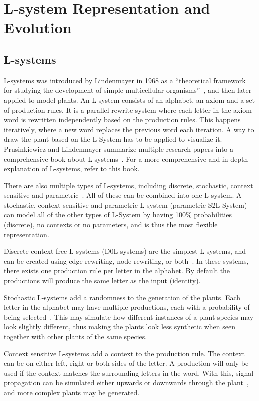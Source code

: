 \chapter{L-system Representation and Evolution}

\section{L-systems}
L-systems was introduced by Lindenmayer in 1968 as a ``theoretical framework for studying the development of simple multicellular organisms''~\cite{2012Prusinkiewicz}, and then later applied to model plants.
An L-system consists of an alphabet, an axiom and a set of production rules.
It is a parallel rewrite system where each letter in the axiom word is rewritten independently based on the production rules.
This happens iteratively, where a new word replaces the previous word each iteration.
A way to draw the plant based on the L-System has to be applied to visualize it.
Prusinkiewicz and Lindenmayer summarize multiple research papers into a comprehensive book about L-systems~\cite{2012Prusinkiewicz}.
For a more comprehensive and in-depth explanation of L-systems, refer to this book.

There are also multiple types of L-systems, including discrete, stochastic, context sensitive and parametric~\cite{2012Prusinkiewicz}.
All of these can be combined into one L-system.
A stochastic, context sensitive and parametric L-system (parametric S2L-System) can model all of the other types of L-System by having 100\% probabilities (discrete), no contexts or no parameters, and is thus the most flexible representation.

Discrete context-free L-systems (D0L-systems) are the simplest L-systems, and can be created using edge rewriting, node rewriting, or both~\cite{2012Prusinkiewicz}.
In these systems, there exists one production rule per letter in the alphabet.
By default the productions will produce the same letter as the input (identity).

Stochastic L-systems add a randomness to the generation of the plants.
Each letter in the alphabet may have multiple productions, each with a probability of being selected~\cite{2012Prusinkiewicz}.
This may simulate how different instances of a plant species may look slightly different, thus making the plants look less synthetic when seen together with other plants of the same species.

Context sensitive L-systems add a context to the production rule.
The context can be on either left, right or both sides of the letter.
A production will only be used if the context matches the surrounding letters in the word.
With this, signal propagation can be simulated either upwards or downwards through the plant~\cite{2012Prusinkiewicz}, and more complex plants may be generated.

